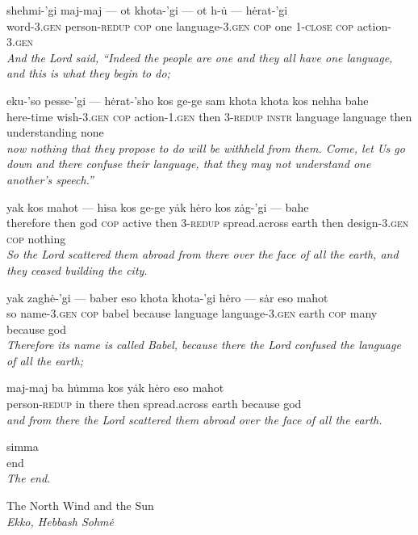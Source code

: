 \documentclass{article}[10pt]
\begin{document}
\begin{exe}
\ex
\gll shehmi-'gi maj-maj --- ot khota-'gi --- ot h-\.{u} --- h\.{e}rat-'gi\\
word-\textsc{3.gen} person-\textsc{redup} \textsc{cop} one language-\textsc{3.gen} \textsc{cop} one 1-\textsc{close} \textsc{cop} action-\textsc{3.gen}\\
\trans \emph{And the Lord said, ``Indeed the people are one and they all have one language, and this is what they begin to do;}

\ex
\gll eku-'so pesse-'gi --- h\.{e}rat-'sho kos ge-ge sam khota khota kos nehha bahe\\
here-time wish-\textsc{3.gen} \textsc{cop} action-\textsc{1.gen} then 3-\textsc{redup} \textsc{instr} language language then understanding none\\
\trans \emph{now nothing that they propose to do will be withheld from them. Come, let Us go down and there confuse their language, that they may not understand one another’s speech.''}

\ex
\gll yak kos mahot --- hisa kos ge-ge y\.{a}k h\.{e}ro kos z\.{a}g-'gi --- bahe\\
therefore then god \textsc{cop} active then 3-\textsc{redup} spread.across earth then design-\textsc{3.gen} \textsc{cop} nothing\\
\trans \emph{So the Lord scattered them abroad from there over the face of all the earth, and they ceased building the city.}

\ex
\gll yak zagh\.{e}-'gi --- baber eso khota khota-'gi h\.{e}ro --- s\.{a}r eso mahot\\
so name-\textsc{3.gen} \textsc{cop} babel because language language-\textsc{3.gen} earth \textsc{cop} many because god\\
\trans \emph{Therefore its name is called Babel, because there the Lord confused the language of all the earth;}

\ex
\gll maj-maj ba h\.{u}mma kos y\.{a}k h\.{e}ro eso mahot\\
person-\textsc{redup} in there then spread.across earth because god\\
\trans \emph{and from there the Lord scattered them abroad over the face of all the earth.}

\ex
\gll simma\\
end\\
\trans \emph{The end.}

\end{exe}
\clearpage

\begin{center} 
The North Wind and the Sun\\
\emph{Ekko, Hebbash Sohm\.{e}}
\end{center}
\end{document}
